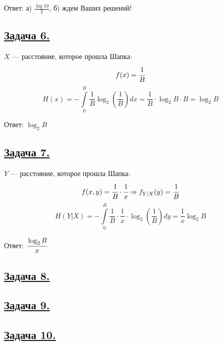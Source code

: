 Ответ: а) $\frac{\log10}{2}$, б) ждем Ваших решений!

\subsection*{\hyperref[sec:problem6]{Задача 6.}}\label{sec:sol_problem6}

$X$ --- расстояние, которое прошла Шапка:
\[f(x)=\cfrac{1}{B}\]
\[H(x)=-\int\limits_{0}^{B}\frac{1}{B}\log_2\left(\frac{1}{B}\right)dx=\frac{1}{B}\cdot \log_2 B\cdot B=\log_2 B\]

Ответ: $\log_2 B$

\subsection*{\hyperref[sec:problem7]{Задача 7.}}\label{sec:sol_problem7}

$Y$ --- расстояние, которое прошла Шапка:
\[f(x, y)=\cfrac{1}{B}\cdot \cfrac{1}{x}\Rightarrow f_{Y|X}(y)=\cfrac{1}{B} \]
\[H(Y|X)=-\int\limits_0^B \frac{1}{B}\cdot \frac{1}{x}\cdot \log_2 \left(\frac{1}{B}\right)dy=\frac{1}{x}\log_2 B \]

Ответ: $\cfrac{\log_2 B}{x}$

\subsection*{\hyperref[sec:problem8]{Задача 8.}}\label{sec:sol_problem8}

\subsection*{\hyperref[sec:problem9]{Задача 9.}}\label{sec:sol_problem9}

\subsection*{\hyperref[sec:problem10]{Задача 10.}}\label{sec:sol_problem10}

